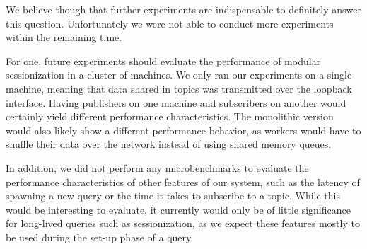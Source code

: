 We believe though that further experiments are indispensable to definitely 
answer this question. Unfortunately we were not able to conduct more experiments
within the remaining time.

For one, future experiments should evaluate the performance of modular sessionization
in a cluster of machines. We only ran our experiments on a single machine, meaning that
data shared in topics was transmitted over the loopback interface.
Having publishers on one machine and subscribers on another would certainly yield
different performance characteristics. The monolithic version would also
likely show a different performance behavior, as workers would have to shuffle their data over the
network instead of using shared memory queues.

In addition, we did not perform any microbenchmarks to evaluate the performance
characteristics of other features of our system, such as the latency
of spawning a new query or the time it takes to subscribe to a topic. While
this would be interesting to evaluate, it currently would only be of little
significance for long-lived queries such as sessionization, as we expect
these features mostly to be used during the set-up phase of a query.
